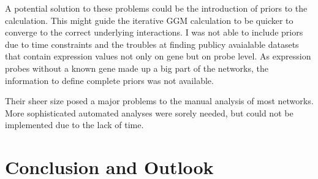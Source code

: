 \documentclass[a4paper,12pt,twoside,openright]{report}
\begin{document}
A potential solution to these problems could be the introduction of priors to the calculation. This might guide the iterative GGM calculation to be quicker to converge to the correct underlying interactions. I was not able to include priors due to time constraints and the troubles at finding publicy avaialable datasets that contain expression values not only on gene but on probe level. As expression probes without a known gene made up a big part of the networks, the information to define complete priors was not available. 

Their sheer size posed a major problems to the manual analysis of most networks. More sophisticated automated analyses were sorely needed, but could not be implemented due to the lack of time. 


\newpage
\chapter{Conclusion and Outlook}
\label{Conclusion and Outlook}


\newpage
\listoffigures
\listoftables

{}

\end{document}
